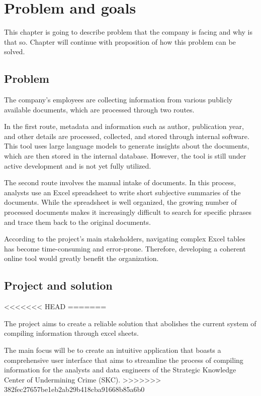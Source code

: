 \section{Problem and goals}
\label{sec:Problem-and-goals}

This chapter is going to describe problem that the company is facing and why is that so. Chapter will continue with proposition of how this problem can be solved. 

\subsection{Problem}
\label{subsec:Problem}
The company’s employees are collecting information from various publicly available documents, which are processed through two routes.

In the first route, metadata and information such as author, publication year, and other details are processed, collected, and stored through internal software. This tool uses large language models to generate insights about the documents, which are then stored in the internal database. However, the tool is still under active development and is not yet fully utilized.

The second route involves the manual intake of documents. In this process, analysts use an Excel spreadsheet to write short subjective summaries of the documents. While the spreadsheet is well organized, the growing number of processed documents makes it increasingly difficult to search for specific phrases and trace them back to the original documents.

According to the project’s main stakeholders, navigating complex Excel tables has become time-consuming and error-prone. Therefore, developing a coherent online tool would greatly benefit the organization.

\subsection{Project and solution}
\label{subsec:Project-or-Solution}
<<<<<<< HEAD
=======

The project aims to create a reliable solution that abolishes the current system of compiling information through excel sheets. 

The main focus will be to create an intuitive application that boasts a comprehensive user interface that aims to streamline the process of compiling information for the analysts and data engineers of the Strategic Knowledge Center of Undermining Crime (SKC).
>>>>>>> 382fec27657be1eb2ab29b418cba91668b85a6b0
